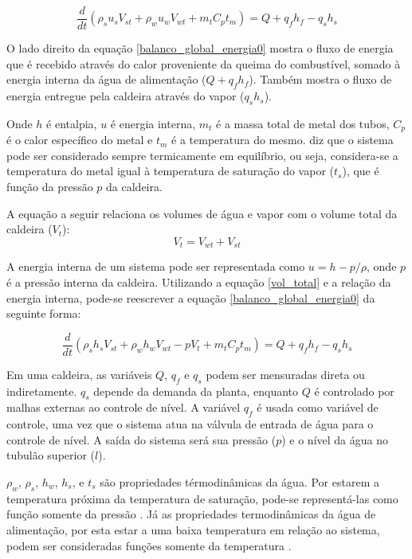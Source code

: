 \begin{equation}
  \dfrac{d}{dt} (\rho_s u_s V_{st} + \rho_w u_w V_{wt} + m_t C_p t_m)
  = Q + q_f h_f - q_s h_s
  \label{balanco_global_energia0}
\end{equation}

O lado direito da equação \ref{balanco_global_energia0} mostra o fluxo
de energia que é recebido através do calor proveniente da queima do
combustível, somado à energia interna da água de alimentação ($ Q +
q_f h_f $). Também mostra o fluxo de energia entregue pela caldeira
através do vapor ($q_s h_s$).

Onde $h$ é entalpia, $u$ é energia interna, $m_t$ é a massa total de
metal dos tubos, $C_p$ é o calor específico do metal e $t_m$ é a
temperatura do mesmo.  diz que o sistema pode ser
considerado sempre termicamente em equilíbrio, ou seja, considera-se a
temperatura do metal igual à temperatura de saturação do vapor
($t_s$), que é função da pressão $p$ da caldeira.

A equação a seguir relaciona os volumes de água e vapor com o volume
total da caldeira ($V_t$):
\begin{equation}
  V_t=V_{wt}+V_{st}
  \label{vol_total}
\end{equation}

A energia interna de um sistema pode ser representada como $u = h - p
/ \rho$, onde $p$ é a pressão interna da caldeira. Utilizando a
equação \ref{vol_total} e a relação da energia interna, pode-se
reescrever a equação \ref{balanco_global_energia0} da seguinte forma:

\begin{equation}
  \dfrac{d}{dt} (\rho_s h_s V_{st} + \rho_w h_w V_{wt} - p V_t + m_t C_p t_m)
  = Q + q_f h_f - q_s h_s
  \label{balanco_global_energia}
\end{equation}

Em uma caldeira, as variáveis $Q$, $q_f$ e $q_s$ podem ser mensuradas
direta ou indiretamente. $q_s$ depende da demanda da planta, enquanto
$Q$ é controlado por malhas externas ao controle de nível. A variável
$q_f$ é usada como variável de controle, uma vez que o sistema atua na
válvula de entrada de água para o controle de nível. A saída do
sistema será sua pressão ($p$) e o nível da água no tubulão superior
($l$).

$\rho_w$, $\rho_s$, $h_w$, $h_s$, e $t_s$ são propriedades
térmodinâmicas da água. Por estarem a temperatura próxima da
temperatura de saturação, pode-se representá-las como função somente
da pressão \cite{garland}. Já as propriedades termodinâmicas da água
de alimentação, por esta estar a uma baixa temperatura em relação ao
sistema, podem ser consideradas funções somente da temperatura
\cite{garland2}.

